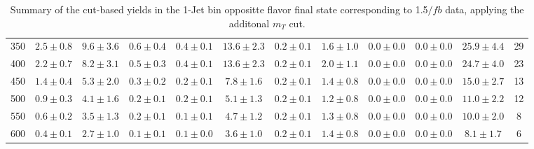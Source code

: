 \begin{table}
{\begin{center}
\begin{tabular}{l c c c c c c c c c c c }
350 & $2.5\pm0.8$ & $9.6\pm3.6$ & $0.6\pm0.4$ & $0.4\pm0.1$ & $13.6\pm2.3$ & $0.2\pm0.1$ & $1.6\pm1.0$ & $0.0\pm0.0$ & $0.0\pm0.0$ & $25.9\pm4.4$ & 29 \\
400 & $2.2\pm0.7$ & $8.2\pm3.1$ & $0.5\pm0.3$ & $0.4\pm0.1$ & $13.6\pm2.3$ & $0.2\pm0.1$ & $2.0\pm1.1$ & $0.0\pm0.0$ & $0.0\pm0.0$ & $24.7\pm4.0$ & 23 \\
450 & $1.4\pm0.4$ & $5.3\pm2.0$ & $0.3\pm0.2$ & $0.2\pm0.1$ & $7.8\pm1.6$ & $0.2\pm0.1$ & $1.4\pm0.8$ & $0.0\pm0.0$ & $0.0\pm0.0$ & $15.0\pm2.7$ & 13 \\
500 & $0.9\pm0.3$ & $4.1\pm1.6$ & $0.2\pm0.1$ & $0.2\pm0.1$ & $5.1\pm1.3$ & $0.2\pm0.1$ & $1.2\pm0.8$ & $0.0\pm0.0$ & $0.0\pm0.0$ & $11.0\pm2.2$ & 12 \\
550 & $0.6\pm0.2$ & $3.5\pm1.3$ & $0.2\pm0.1$ & $0.1\pm0.1$ & $4.7\pm1.2$ & $0.2\pm0.1$ & $1.3\pm0.8$ & $0.0\pm0.0$ & $0.0\pm0.0$ & $10.0\pm2.0$ & 8 \\
600 & $0.4\pm0.1$ & $2.7\pm1.0$ & $0.1\pm0.1$ & $0.1\pm0.0$ & $3.6\pm1.0$ & $0.2\pm0.1$ & $1.4\pm0.8$ & $0.0\pm0.0$ & $0.0\pm0.0$ & $8.1\pm1.7$ & 6 \\
\hline
\end{tabular}
\end{center}
}
\caption{Summary of the cut-based yields in the 1-Jet bin oppositte flavor final state corresponding to 1.5$/fb$ data, applying the additonal $m_T$ cut.}
\end{table}
